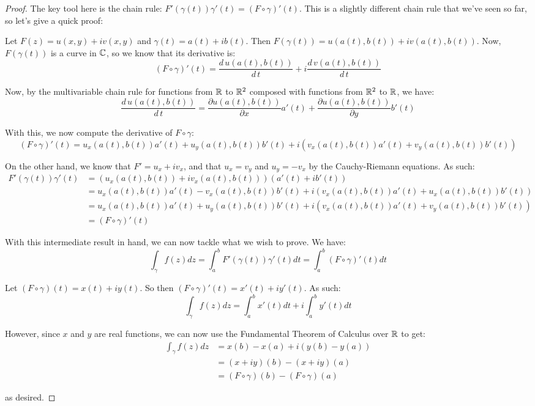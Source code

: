 \begin{proof} The key tool here is the chain rule: $F'(\gamma(t))\gamma'(t) = (F\circ \gamma)'(t)$. This is a slightly different chain rule that we've seen so far, so let's give a quick proof:

Let $F(z) = u(x,y) + iv(x,y)$ and $\gamma(t) = a(t) + ib(t)$. Then $F(\gamma(t)) = u(a(t),b(t)) + iv(a(t),b(t))$. Now, $F(\gamma(t))$ is a curve in $\mathbb{C}$, so we know that its derivative is:
$$(F\circ \gamma)'(t) = \frac{d\, u(a(t),b(t))}{d\,t} +i \frac{d\, v(a(t),b(t))}{d\,t}$$

Now, by the multivariable chain rule for functions from $\mathbb{R}$ to $\mathbb{R}^2$ composed with functions from $\mathbb{R}^2$ to $\mathbb{R}$, we have:
$$\frac{d\, u(a(t),b(t))}{d\,t} = \frac{\partial u(a(t),b(t))}{\partial x}a'(t) + \frac{\partial u(a(t),b(t))}{\partial y}b'(t)$$

With this, we now compute the derivative of $F\circ \gamma$:
$$(F\circ \gamma)'(t) = u_x(a(t),b(t))a'(t) + u_y(a(t),b(t))b'(t) + i\left(v_x(a(t),b(t))a'(t) + v_y(a(t),b(t))b'(t)\right)$$

On the other hand, we know that $F' = u_x + iv_x$, and that $u_x = v_y$ and $u_y = -v_x$ by the Cauchy-Riemann equations. As such:
\begin{align*}F'(\gamma(t))\gamma'(t) &= (u_x(a(t),b(t)) + iv_x(a(t),b(t)))(a'(t) + ib'(t))\\
&= u_x(a(t),b(t))a'(t) - v_x (a(t),b(t))b'(t) + i\left(v_x(a(t),b(t))a'(t) + u_x(a(t),b(t))b'(t)\right)\\
&= u_x(a(t),b(t))a'(t) + u_y(a(t),b(t))b'(t) + i\left(v_x(a(t),b(t))a'(t) + v_y(a(t),b(t))b'(t)\right)\\
&= (F\circ \gamma)'(t)
\end{align*}

With this intermediate result in hand, we can now tackle what we wish to prove. We have:
$$\int_{\gamma} f(z)dz = \int_{a}^b F'(\gamma(t))\gamma'(t)dt = \int_a^b (F\circ \gamma)'(t)dt$$

Let $(F\circ \gamma)(t) = x(t) + iy(t)$. So then $(F\circ \gamma)'(t) = x'(t) + iy'(t)$. As such:
$$\int_{\gamma} f(z)dz = \int_{a}^b x'(t)dt + i \int_{a}^b y'(t)dt$$

However, since $x$ and $y$ are real functions, we can now use the Fundamental Theorem of Calculus over $\mathbb{R}$ to get:
\begin{align*} \int_\gamma f(z)dz &= x(b) - x(a) + i(y(b) - y(a))\\
&= (x + iy)(b) - (x + iy)(a)\\
&= (F\circ \gamma)(b) - (F\circ \gamma)(a)
\end{align*}

\noin as desired.
\end{proof}

